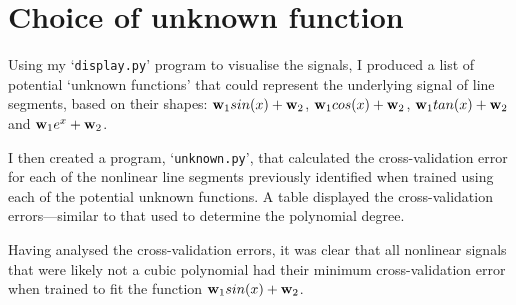 \documentclass[onecolumn, 12pt, a4paper]{article}
\begin{document}
\section{Choice of unknown function}

Using my `\texttt{display.py}' program to visualise the
signals, I produced a list of potential `unknown functions'
that could represent the underlying signal of line segments,
based on their shapes:
$\vb{w}_{1}sin(x) + \vb{w}_{2}$,
$\vb{w}_{1}cos(x) + \vb{w}_{2}$,
$\vb{w}_{1}tan(x) + \vb{w}_{2}$ and
$\vb{w}_{1}e^{x} + \vb{w}_{2}$.

I then created a program, `\texttt{unknown.py}', that
calculated the cross-validation error for each of the
nonlinear line segments previously identified when
trained using each of the potential unknown functions.
A table displayed the cross-validation errors---similar 
to that used to determine the polynomial degree.

Having analysed the cross-validation errors, it was clear
that all nonlinear signals that were likely not
a cubic polynomial had their minimum cross-validation
error when trained to fit the function
$\vb{w}_{1}sin(x) + \vb{w}_{2}$.
\end{document}
